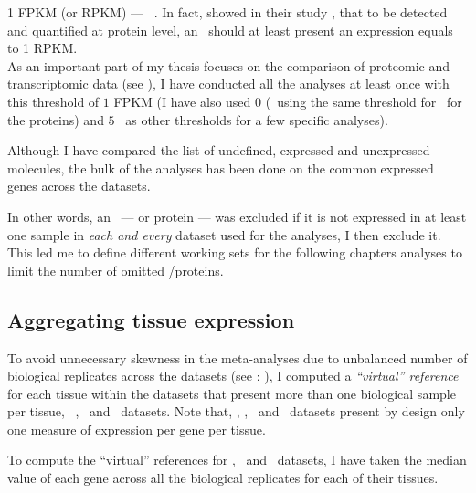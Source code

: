 \begin{itemize}
\begin{itemize}
                1 \gls{FPKM} (or \gls{RPKM}) --- \eg{}~\citet{Uhlen2014,Uhlen2015}.
                In fact, \citet{Hebenstreit:2011} showed in their study
                ,
                that to be detected and quantified at protein level,
                an \mRNA\ should at least present an expression equals to 1 \gls{RPKM}.\\
                As an important part of my thesis focuses on
                the comparison of proteomic and transcriptomic data (see ),
                I have conducted all the analyses at least once with this threshold of $1$ \gls{FPKM}
                (I have also used $0$ (\ie\ using the same threshold for \mRNAs\
                for the proteins) and $5$ \FPKM\ as other thresholds
                for a few specific analyses).
        \end{itemize}
\end{itemize}

\vspace{-0.1in}
Although I have compared the list of
undefined, expressed and unexpressed molecules,
the bulk of the analyses has been done on the common expressed genes across
the datasets.

In other words, an \mRNA\ --- or protein --- was excluded
if it is not expressed in at least
one sample in \emph{each and every} dataset used for the analyses,
I then exclude it.
This led me to define different working sets for the following chapters analyses
to limit the number of omitted \mRNAs/proteins.

\subsection{Aggregating tissue expression}\label{subsec:averagedTissue}
\vspace{-0.15in}
To avoid unnecessary skewness in the meta-analyses due to
unbalanced number of
biological replicates across the datasets (see :
\nameref{sec:expDesign}),
I computed a \emph{\enquote{virtual} reference} for each tissue
within the datasets that present more than one biological sample per tissue,
\ie\ \vt, \uhlen\ and \gtex\ datasets.
Note that, \castle, \cutler, \kuster\ and \pandey\ datasets present by design only
one measure of expression per gene per tissue.

To compute the \enquote{virtual} references for \vt, \uhlen\ and \gtex\ datasets,
I have taken the median value of each gene across all the
biological replicates for each of their tissues.




